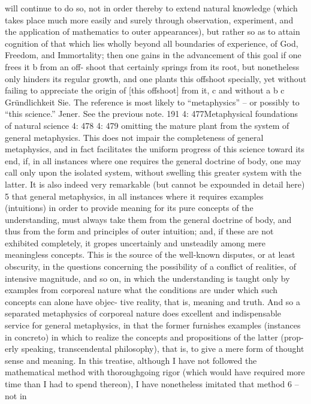 will continue to do so, not in order thereby to extend natural knowledge
(which takes place much more easily and surely through observation,
experiment, and the application of mathematics to outer appearances),
but rather so as to attain cognition of that which lies wholly beyond
all boundaries of experience, of God, Freedom, and Immortality; then
one gains in the advancement of this goal if one frees it b from an off-
shoot that certainly springs from its root, but nonetheless only hinders
its regular growth, and one plants this offshoot specially, yet without
failing to appreciate the origin of [this offshoot] from it, c and without
a
b
c
Gründlichkeit
Sie. The reference is most likely to “metaphysics” – or possibly to “this science.”
Jener. See the previous note.
191
4: 477Metaphysical foundations of natural science
4: 478
4: 479
omitting the mature plant from the system of general metaphysics. This
does not impair the completeness of general metaphysics, and in fact
facilitates the uniform progress of this science toward its end, if, in all
instances where one requires the general doctrine of body, one may call
only upon the isolated system, without swelling this greater system with
the latter. It is also indeed very remarkable (but cannot be expounded in
detail here) 5 that general metaphysics, in all instances where it requires
examples (intuitions) in order to provide meaning for its pure concepts
of the understanding, must always take them from the general doctrine
of body, and thus from the form and principles of outer intuition; and, if
these are not exhibited completely, it gropes uncertainly and unsteadily
among mere meaningless concepts. This is the source of the well-known
disputes, or at least obscurity, in the questions concerning the possibility
of a conﬂict of realities, of intensive magnitude, and so on, in which the
understanding is taught only by examples from corporeal nature what
the conditions are under which such concepts can alone have objec-
tive reality, that is, meaning and truth. And so a separated metaphysics
of corporeal nature does excellent and indispensable service for general
metaphysics, in that the former furnishes examples (instances in concreto)
in which to realize the concepts and propositions of the latter (prop-
erly speaking, transcendental philosophy), that is, to give a mere form
of thought sense and meaning.
In this treatise, although I have not followed the mathematical method
with thoroughgoing rigor (which would have required more time than I
had to spend thereon), I have nonetheless imitated that method 6 – not in
